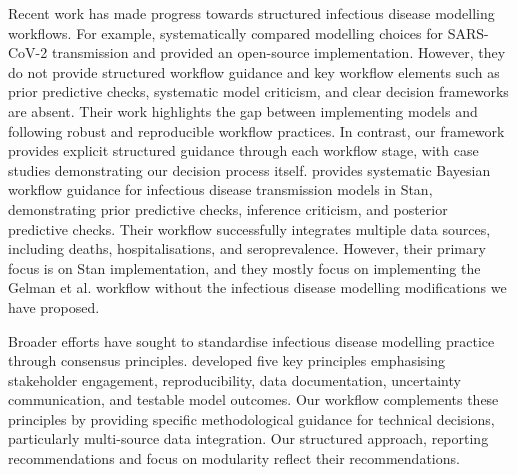 \documentclass{article}
\begin{document}
Recent work has made progress towards structured infectious disease modelling workflows.
For example, \citet{bouman2024bayesian} systematically compared modelling choices for \ac{SARS-CoV-2} transmission and provided an open-source implementation.
However, they do not provide structured workflow guidance and key workflow elements such as prior predictive checks, systematic model criticism, and clear decision frameworks are absent.
Their work highlights the gap between implementing models and following robust and reproducible workflow practices.
In contrast, our framework provides explicit structured guidance through each workflow stage, with case studies demonstrating our decision process itself.
\citet{grinsztajn2021bayesian} provides systematic Bayesian workflow guidance for infectious disease transmission models in Stan, demonstrating prior predictive checks, inference criticism, and posterior predictive checks. 
Their workflow successfully integrates multiple data sources, including deaths, hospitalisations, and seroprevalence. 
However, their primary focus is on Stan implementation, and they mostly focus on implementing the Gelman et al. workflow without the infectious disease modelling modifications we have proposed.

Broader efforts have sought to standardise infectious disease modelling practice through consensus principles. \citet{Behrend2020-au} developed five key principles emphasising stakeholder engagement, reproducibility, data documentation, uncertainty communication, and testable model outcomes. 
Our workflow complements these principles by providing specific methodological guidance for technical decisions, particularly multi-source data integration.
Our structured approach, reporting recommendations and focus on modularity reflect their recommendations.

\end{document}
